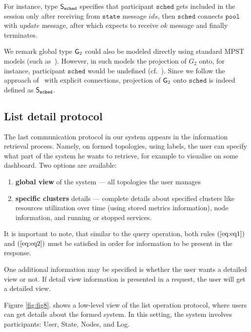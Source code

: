 For instance, type ${\mathsf S}_\mathtt{sched}$ specifies that participant $\mathtt{sched}$ gets included in the session only after receiving from $\mathtt{state}$ message $\mathit{ids}$, then $\mathtt{sched}$ connects $\mathtt{pool}$ with $\mathit{update}$ message, after which expects to receive $\mathit{ok}$ message and finally terminates. 

We remark global type ${\sf G}_2$ could also be modeled directly using standard MPST models (such as~\cite{HondaYC08}). However, in such models the projection of $G_2$ onto, for instance, participant $\mathtt{sched}$ would be undefined (cf.~\cite{HuY17}).
Since we follow the approach of~\cite{HuY17} with explicit connections, projection of ${\sf G}_2$ onto $\mathtt{sched}$ is indeed defined as ${\mathsf S}_\mathtt{sched}$.
%
%
\subsection{List detail protocol}\label{sec:list_detail_protocol}
%
The last communication protocol in our system appears in the information retrieval process. Namely, on formed topologies, using labels, the user can specify what part of the system he wants to retrieve, for example to visualise on some dashboard. Two options are available: 

\begin{enumerate}[start=1,label={(\bfseries \arabic*)}]
	\item \textbf{global view} of the system --- all topologies the user manages
	\item \textbf{specific clusters} details --- complete details about specified clusters like resources utilization over time (using stored metrics information), node information, and running or stopped services.
\end{enumerate}

It is important to note, that similar to the query operation, both rules $(\ref{eq:eq1})$ and $(\ref{eq:eq2})$ must be satisfied in order for information to be present in the response. 

One additional information may be specified is whether the user wants a detailed view or not. If detail view information is presented in a request, the user will get a detailed view. 

Figure \ref{fig:fig8}. shows a low-level view of the list operation protocol, where users can get details about the formed system. In this setting, the system involves participants: User, State, Nodes, and Log. 

